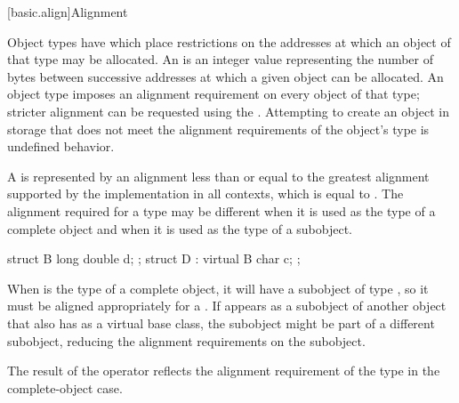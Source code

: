 [basic.align]{Alignment}

\pnum
Object types have 
which place restrictions on the addresses at which an object of that type
may be allocated. An  is an 
integer value representing the number of bytes between successive addresses
at which a given object can be allocated. An object type imposes an alignment
requirement on every object of that type; stricter alignment can be requested
using the .
Attempting to create an object in storage that
does not meet the alignment requirements of the object's type
is undefined behavior.
%
%
%
%
%

\pnum
A  is represented by an alignment
less than or equal to the greatest alignment supported by the implementation in
all contexts, which is equal to
.
The alignment required for a type may be different when it is used as the type
of a complete object and when it is used as the type of a subobject.
\begin{example}
\begin{codeblock}
struct B { long double d; };
struct D : virtual B { char c; };
\end{codeblock}

When  is the type of a complete object, it will have a subobject of
type , so it must be aligned appropriately for a .
If  appears as a subobject of another object that also has 
as a virtual base class, the  subobject might be part of a different
subobject, reducing the alignment requirements on the  subobject.
\end{example}
The result of the  operator reflects the alignment
requirement of the type in the complete-object case.

